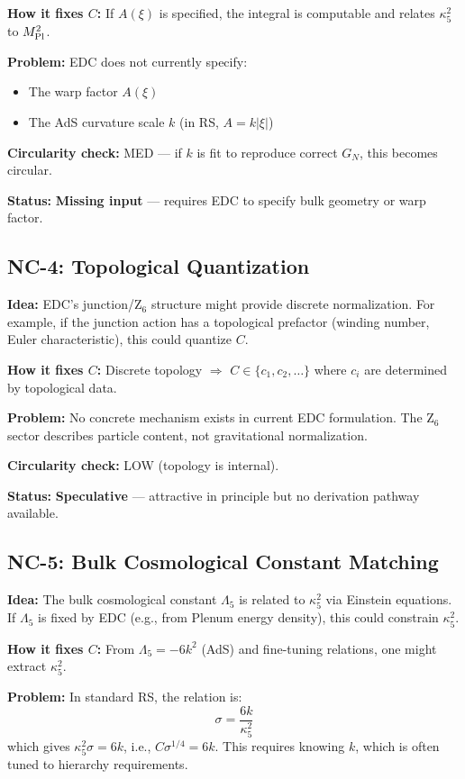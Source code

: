 \documentclass[11pt,a4paper]{article}
\begin{document}
\textbf{How it fixes $C$:} If $A(\xi)$ is specified, the integral is computable
and relates $\kappa_5^2$ to $M_{\rm Pl}^2$.

\textbf{Problem:} EDC does not currently specify:
\begin{itemize}
\item The warp factor $A(\xi)$
\item The AdS curvature scale $k$ (in RS, $A = k|\xi|$)
\end{itemize}

\textbf{Circularity check:} MED --- if $k$ is fit to reproduce correct $G_N$,
this becomes circular.

\textbf{Status:} \textbf{Missing input} --- requires EDC to specify bulk
geometry or warp factor.

\subsection{NC-4: Topological Quantization}

\textbf{Idea:} EDC's junction/Z$_6$ structure might provide discrete
normalization. For example, if the junction action has a topological
prefactor (winding number, Euler characteristic), this could quantize $C$.

\textbf{How it fixes $C$:} Discrete topology $\Rightarrow$ $C \in \{c_1, c_2, \ldots\}$
where $c_i$ are determined by topological data.

\textbf{Problem:} No concrete mechanism exists in current EDC formulation.
The Z$_6$ sector describes particle content, not gravitational normalization.

\textbf{Circularity check:} LOW (topology is internal).

\textbf{Status:} \textbf{Speculative} --- attractive in principle but no
derivation pathway available.

\subsection{NC-5: Bulk Cosmological Constant Matching}

\textbf{Idea:} The bulk cosmological constant $\Lambda_5$ is related to
$\kappa_5^2$ via Einstein equations. If $\Lambda_5$ is fixed by EDC
(e.g., from Plenum energy density), this could constrain $\kappa_5^2$.

\textbf{How it fixes $C$:} From $\Lambda_5 = -6k^2$ (AdS) and fine-tuning
relations, one might extract $\kappa_5^2$.

\textbf{Problem:} In standard RS, the relation is:
\[
\sigma = \frac{6k}{\kappa_5^2}
\]
which gives $\kappa_5^2 \sigma = 6k$, i.e., $C \sigma^{1/4} = 6k$.
This requires knowing $k$, which is often tuned to hierarchy requirements.
\end{document}
